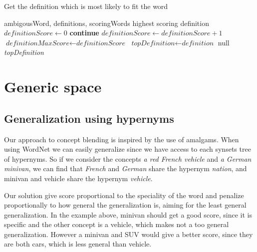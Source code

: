 \begin{algorithm}
	\caption{Get the definition which is most likely to fit the word}\label{euclid}
	\begin{algorithmic}[1]
		\Require ambigousWord,
		definitions,
		scoringWords
		\Ensure highest scoring definition
		\State $\textit{definitionScore} \gets 0$
		\State \textbf{continue}
		\EndIf
		\State ${\textit{definitionScore} \gets {\textit{definitionScore}+1}}$
		\EndIf
		\EndFor
		\EndFor
		\State ${\textit{definitionMaxScore}} \gets {\textit{definitionScore}}$
		\State ${\textit{topDefinition}} \gets {\textit{definition}}$
		\EndIf
		\EndFor
		\Return null
		\EndIf
		\State \Return \textit{topDefinition}
		\EndProcedure
	\end{algorithmic}
\end{algorithm}


\section{Generic space}
\subsection{Generalization using hypernyms}
Our approach to concept blending is inspired by the use of amalgams. When using WordNet we can easily generalize since we have access to each synsets tree of hypernyms. So if we consider the concepts \emph{a red French vehicle} and \emph{a German minivan}, we can find that \emph{French} and \emph{German} share the hypernym \emph{nation}, and minivan and vehicle share the hypernym \emph{vehicle}.

Our solution give score proportional to the speciality of the word and penalize proportionally to how general the generalization is, aiming for the least general generalization. In the example above, minivan should get a good score, since it is specific and the other concept is a vehicle, which makes not a too general generalization. However a minivan and SUV would give a better score, since they are both cars, which is less general than vehicle.

